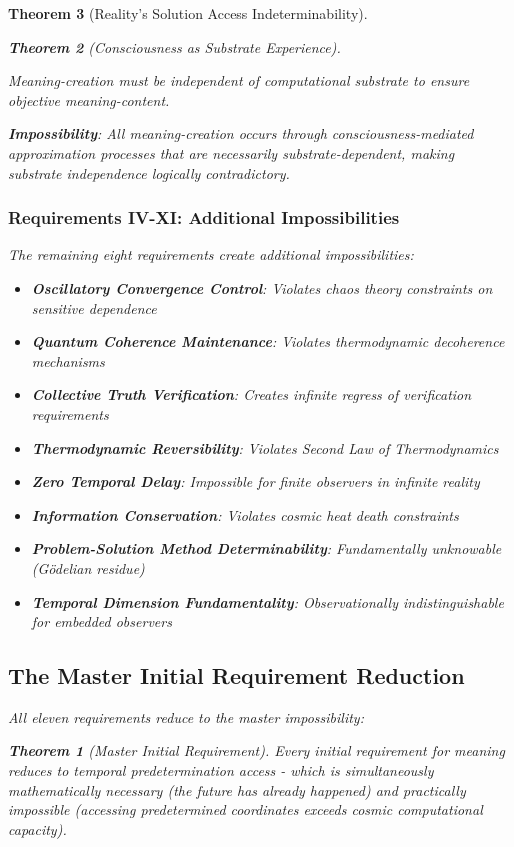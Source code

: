 \documentclass[12pt,a4paper]{article}
\newtheorem{theorem}{Theorem}[section]
\theoremstyle{remark}
\begin{document}
\begin{theorem}[Reality's Solution Access Indeterminability]
\begin{theorem}[Consciousness as Substrate Experience]
\begin{requirement}
Meaning-creation must be independent of computational substrate to ensure objective meaning-content.
\end{requirement}

\textbf{Impossibility}: All meaning-creation occurs through consciousness-mediated approximation processes that are necessarily substrate-dependent, making substrate independence logically contradictory.

\subsubsection{Requirements IV-XI: Additional Impossibilities}

The remaining eight requirements create additional impossibilities:

\begin{itemize}
\item \textbf{Oscillatory Convergence Control}: Violates chaos theory constraints on sensitive dependence
\item \textbf{Quantum Coherence Maintenance}: Violates thermodynamic decoherence mechanisms
\item \textbf{Collective Truth Verification}: Creates infinite regress of verification requirements
\item \textbf{Thermodynamic Reversibility}: Violates Second Law of Thermodynamics
\item \textbf{Zero Temporal Delay}: Impossible for finite observers in infinite reality
\item \textbf{Information Conservation}: Violates cosmic heat death constraints
\item \textbf{Problem-Solution Method Determinability}: Fundamentally unknowable (Gödelian residue)
\item \textbf{Temporal Dimension Fundamentality}: Observationally indistinguishable for embedded observers
\end{itemize}

\subsection{The Master Initial Requirement Reduction}

All eleven requirements reduce to the master impossibility:

\begin{theorem}[Master Initial Requirement]
Every initial requirement for meaning reduces to temporal predetermination access - which is simultaneously mathematically necessary (the future has already happened) and practically impossible (accessing predetermined coordinates exceeds cosmic computational capacity).
\end{theorem}


\end{theorem}
\end{theorem}
\end{document}
